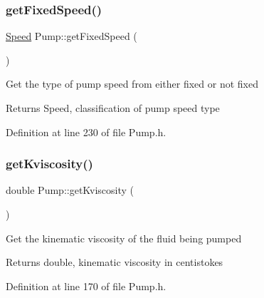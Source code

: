 \mbox{\label{class_pump_ae9a63b7e616ba2ef7723d1040af241b4}} 
\subsubsection{\texorpdfstring{get\+Fixed\+Speed()}{getFixedSpeed()}\hspace{0.1cm}{\footnotesize\ttfamily [3/3]}}
{\footnotesize\ttfamily \hyperlink{class_pump_ae443603074ebca82f0b89209482d10b6}{Speed} Pump\+::get\+Fixed\+Speed (\begin{DoxyParamCaption}{ }\end{DoxyParamCaption})\hspace{0.3cm}{\ttfamily [inline]}}

Get the type of pump speed from either fixed or not fixed

\begin{DoxyReturn}{Returns}
Speed, classification of pump speed type 
\end{DoxyReturn}


Definition at line 230 of file Pump.\+h.

\mbox{\label{class_pump_a7b834ffb06cbfd643043e3a26ca1af6e}} 
\subsubsection{\texorpdfstring{get\+Kviscosity()}{getKviscosity()}\hspace{0.1cm}{\footnotesize\ttfamily [1/3]}}
{\footnotesize\ttfamily double Pump\+::get\+Kviscosity (\begin{DoxyParamCaption}{ }\end{DoxyParamCaption})\hspace{0.3cm}{\ttfamily [inline]}}

Get the kinematic viscosity of the fluid being pumped

\begin{DoxyReturn}{Returns}
double, kinematic viscosity in centistokes 
\end{DoxyReturn}


Definition at line 170 of file Pump.\+h.

\mbox{\label{class_pump_a7b834ffb06cbfd643043e3a26ca1af6e}} 

